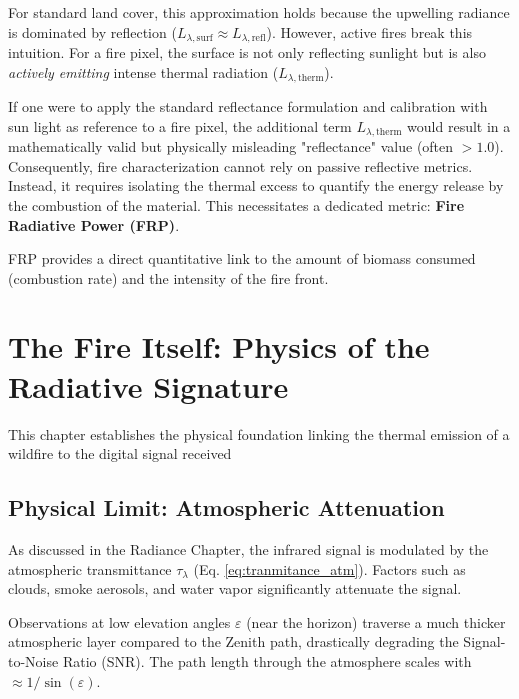 \begin{table}[ht]
{For standard land cover, this approximation holds because the upwelling radiance is dominated by reflection ($L_{\lambda,\mathrm{surf}} \approx L_{\lambda,\mathrm{refl}}$). However, active fires break this intuition. For a fire pixel, the surface is not only reflecting sunlight but is also \emph{actively emitting} intense thermal radiation ($L_{\lambda,\mathrm{therm}}$). 



If one were to apply the standard reflectance formulation and calibration with sun light as reference to a fire pixel, the additional term $L_{\lambda,\mathrm{therm}}$ would result in a mathematically valid but physically misleading "reflectance" value (often $> 1.0$). Consequently, fire characterization cannot rely on passive reflective metrics. Instead, it requires isolating the thermal excess to quantify the energy release by the combustion of the material. This necessitates a dedicated metric: \textbf{Fire Radiative Power (FRP)}. 



FRP provides a direct quantitative link to the amount of biomass consumed (combustion rate) and the intensity of the fire front. 



\section{The Fire Itself: Physics of the Radiative Signature}

\label{31-the-fire-itself-physics-of-the-radiative-signature}



This chapter establishes the physical foundation linking the thermal emission of a wildfire to the digital signal received 

\subsection{Physical Limit: Atmospheric Attenuation}
\label{subsec:atmospheric_limit}
As discussed in the Radiance Chapter, the infrared signal is modulated by the atmospheric transmittance $\tau_\lambda$ (Eq. \ref{eq:tranmitance_atm}). Factors such as clouds, smoke aerosols, and water vapor significantly attenuate the signal.

Observations at low elevation angles $\varepsilon$ (near the horizon) traverse a much thicker atmospheric layer compared to the Zenith path, drastically degrading the Signal-to-Noise Ratio (SNR). The path length through the atmosphere scales with $\approx 1/\sin(\varepsilon)$. 

}
\end{table}

